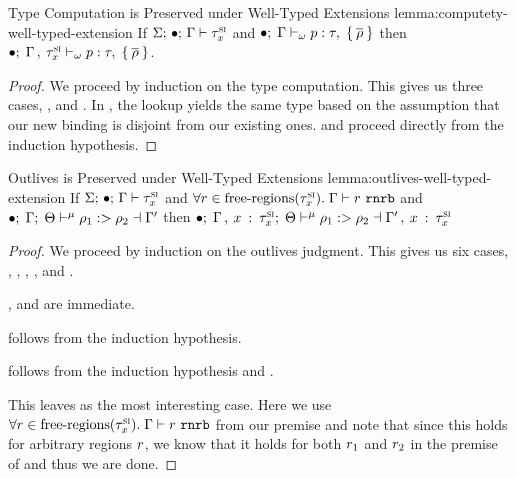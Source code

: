 \begin{oxlemma}{Type Computation is Preserved under Well-Typed Extensions}
  {lemma:computety-well-typed-extension} If
  $\Sigma; \, \bullet; \, \Gamma \vdash \tau^\textsc{si}_x$ and
  $ \bullet; \; \Gamma \vdash_{\omega} p : \tau, \; \{ \: \overline{\rho} \: \} $ then $ \bullet; \; 
    \Gamma \, , \: \tau^\textsc{si}_x
   \vdash_{\omega} p : \tau, \; \{ \: \overline{\rho} \: \} $.
\end{oxlemma}

\begin{proof}
  We proceed by induction on the type computation. This gives us three cases,
  ,  and . In ,
  the lookup yields the same type based on the assumption that our new binding
  is disjoint from our existing ones.  and 
  proceed directly from the induction hypothesis.
\end{proof}

\begin{oxlemma}{Outlives is Preserved under Well-Typed Extensions}
  {lemma:outlives-well-typed-extension} If
  $\Sigma; \, \bullet; \, \Gamma \vdash \tau^\textsc{si}_x$ and
  $\forall r \in \textrm{free-regions}(\tau^\textsc{si}_x). \;
  \Gamma \vdash r \ \mathtt{rnrb}$ and
  $\bullet; \; \Gamma; \; \Theta \vdash^{\mu} \rho_1 :> \rho_2 \dashv \Gamma^\prime$
  then $\bullet; \;  \Gamma \, , \: 
      x \: : \: \tau^\textsc{si}_x ; \; \Theta \vdash^{\mu} \rho_1 :> \rho_2 \dashv 
    \Gamma^\prime \, , \:  x \: : \: \tau^\textsc{si}_x$
\end{oxlemma}

\begin{proof}
  We proceed by induction on the outlives judgment. This gives us six cases,
  , , ,
  ,  and
  .

  ,  and 
  are immediate.

   follows from the induction hypothesis.

   follows from the induction hypothesis and
  .

  This leaves  as the most interesting case. Here we
  use $\forall r \in \textrm{free-regions}(\tau^\textsc{si}_x). \;
  \Gamma \vdash r \ \mathtt{rnrb}$ from our premise and note that since
  this holds for arbitrary regions $r$, we know that it holds for both
  $r_1$ and $r_2$ in the premise of  and
  thus we are done.
\end{proof}

